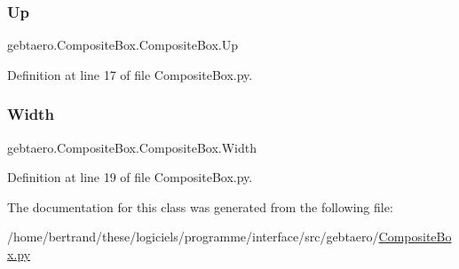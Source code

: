 \subsubsection{\texorpdfstring{Up}{Up}}
{\footnotesize\ttfamily gebtaero.\+Composite\+Box.\+Composite\+Box.\+Up}



Definition at line 17 of file Composite\+Box.\+py.

\mbox{\label{classgebtaero_1_1_composite_box_1_1_composite_box_a44593d7302ceb1c46ac637437b5e1061}} 
\subsubsection{\texorpdfstring{Width}{Width}}
{\footnotesize\ttfamily gebtaero.\+Composite\+Box.\+Composite\+Box.\+Width}



Definition at line 19 of file Composite\+Box.\+py.



The documentation for this class was generated from the following file\+:\begin{DoxyCompactItemize}
\item 
/home/bertrand/these/logiciels/programme/interface/src/gebtaero/\hyperlink{_composite_box_8py}{Composite\+Box.\+py}\end{DoxyCompactItemize}
